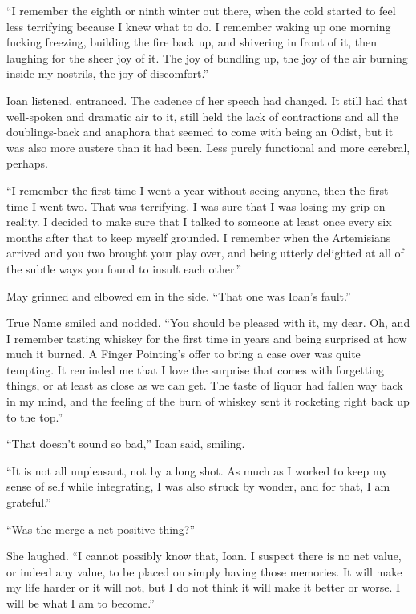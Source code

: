 ``I remember the eighth or ninth winter out there, when the cold started to feel less terrifying because I knew what to do. I remember waking up one morning fucking freezing, building the fire back up, and shivering in front of it, then laughing for the sheer joy of it. The joy of bundling up, the joy of the air burning inside my nostrils, the joy of discomfort.''

Ioan listened, entranced. The cadence of her speech had changed. It still had that well-spoken and dramatic air to it, still held the lack of contractions and all the doublings-back and anaphora that seemed to come with being an Odist, but it was also more austere than it had been. Less purely functional and more cerebral, perhaps.

``I remember the first time I went a year without seeing anyone, then the first time I went two. That was terrifying. I was sure that I was losing my grip on reality. I decided to make sure that I talked to someone at least once every six months after that to keep myself grounded. I remember when the Artemisians arrived and you two brought your play over, and being utterly delighted at all of the subtle ways you found to insult each other.''

May grinned and elbowed em in the side. ``That one was Ioan's fault.''

True Name smiled and nodded. ``You should be pleased with it, my dear. Oh, and I remember tasting whiskey for the first time in years and being surprised at how much it burned. A Finger Pointing's offer to bring a case over was quite tempting. It reminded me that I love the surprise that comes with forgetting things, or at least as close as we can get. The taste of liquor had fallen way back in my mind, and the feeling of the burn of whiskey sent it rocketing right back up to the top.''

``That doesn't sound so bad,'' Ioan said, smiling.

``It is not all unpleasant, not by a long shot. As much as I worked to keep my sense of self while integrating, I was also struck by wonder, and for that, I am grateful.''

``Was the merge a net-positive thing?''

She laughed. ``I cannot possibly know that, Ioan. I suspect there is no net value, or indeed any value, to be placed on simply having those memories. It will make my life harder or it will not, but I do not think it will make it better or worse. I will be what I am to become.''

